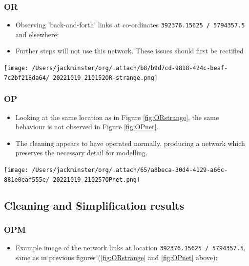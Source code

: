 \documentclass[11pt]{article}
\begin{document}
\subsubsection{OR}
\label{sec:org49e8cd9}
\begin{itemize}
\item Observing 'back-and-forth' links at co-ordinates \texttt{392376.15625 / 5794357.5} and elsewhere:
\item Further steps will not use this network. These issues should first be rectified
\end{itemize}

\begin{center}
\texttt{[image: /Users/jackminster/org/.attach/b8/b9d7cd-9818-424c-beaf-7c2bf218da64/\_20221019\_210152OR-strange.png]}
\end{center}
\subsubsection{OP}
\label{sec:orgae674ed}
\begin{itemize}
\item Looking at the same location as in Figure \ref{fig:ORstrange}, the same behaviour is not observed in Figure \ref{fig:OPnet}.
\item The cleaning appears to have operated normally, producing a network which preserves the necessary detail for modelling.
\end{itemize}

\begin{center}
\texttt{[image: /Users/jackminster/org/.attach/65/a8beca-30d4-4129-a66c-881e0eaf555e/\_20221019\_210257OPnet.png]}
\end{center}

\subsection{Cleaning and Simplification results}
\label{sec:org084c0ea}
\subsubsection{OPM}
\label{sec:orge5e2dfc}
\begin{itemize}
\item Example image of the network links at location \texttt{392376.15625 / 5794357.5}, same as in previous figures (\ref{fig:ORstrange} and \ref{fig:OPnet} above):
\end{itemize}
\end{document}
